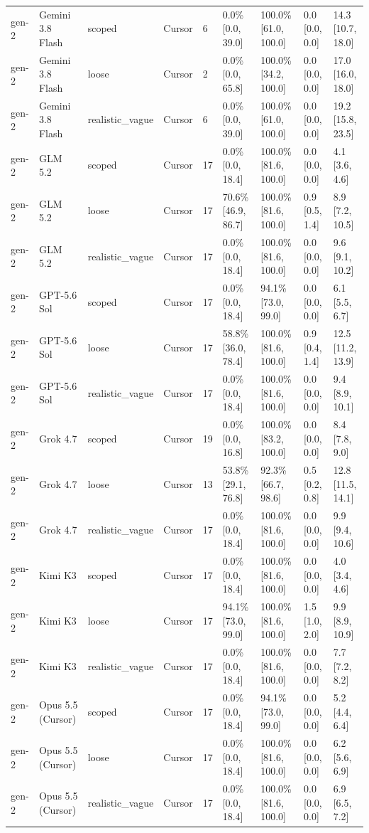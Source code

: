 \begin{tabular}{lllllllll}
gen-2 & Gemini 3.8 Flash & scoped & Cursor & 6 & 0.0\% [0.0, 39.0] & 100.0\% [61.0, 100.0] & 0.0 [0.0, 0.0] & 14.3 [10.7, 18.0] \\
gen-2 & Gemini 3.8 Flash & loose & Cursor & 2 & 0.0\% [0.0, 65.8] & 100.0\% [34.2, 100.0] & 0.0 [0.0, 0.0] & 17.0 [16.0, 18.0] \\
gen-2 & Gemini 3.8 Flash & realistic\_vague & Cursor & 6 & 0.0\% [0.0, 39.0] & 100.0\% [61.0, 100.0] & 0.0 [0.0, 0.0] & 19.2 [15.8, 23.5] \\
gen-2 & GLM 5.2 & scoped & Cursor & 17 & 0.0\% [0.0, 18.4] & 100.0\% [81.6, 100.0] & 0.0 [0.0, 0.0] & 4.1 [3.6, 4.6] \\
gen-2 & GLM 5.2 & loose & Cursor & 17 & 70.6\% [46.9, 86.7] & 100.0\% [81.6, 100.0] & 0.9 [0.5, 1.4] & 8.9 [7.2, 10.5] \\
gen-2 & GLM 5.2 & realistic\_vague & Cursor & 17 & 0.0\% [0.0, 18.4] & 100.0\% [81.6, 100.0] & 0.0 [0.0, 0.0] & 9.6 [9.1, 10.2] \\
gen-2 & GPT-5.6 Sol & scoped & Cursor & 17 & 0.0\% [0.0, 18.4] & 94.1\% [73.0, 99.0] & 0.0 [0.0, 0.0] & 6.1 [5.5, 6.7] \\
gen-2 & GPT-5.6 Sol & loose & Cursor & 17 & 58.8\% [36.0, 78.4] & 100.0\% [81.6, 100.0] & 0.9 [0.4, 1.4] & 12.5 [11.2, 13.9] \\
gen-2 & GPT-5.6 Sol & realistic\_vague & Cursor & 17 & 0.0\% [0.0, 18.4] & 100.0\% [81.6, 100.0] & 0.0 [0.0, 0.0] & 9.4 [8.9, 10.1] \\
gen-2 & Grok 4.7 & scoped & Cursor & 19 & 0.0\% [0.0, 16.8] & 100.0\% [83.2, 100.0] & 0.0 [0.0, 0.0] & 8.4 [7.8, 9.0] \\
gen-2 & Grok 4.7 & loose & Cursor & 13 & 53.8\% [29.1, 76.8] & 92.3\% [66.7, 98.6] & 0.5 [0.2, 0.8] & 12.8 [11.5, 14.1] \\
gen-2 & Grok 4.7 & realistic\_vague & Cursor & 17 & 0.0\% [0.0, 18.4] & 100.0\% [81.6, 100.0] & 0.0 [0.0, 0.0] & 9.9 [9.4, 10.6] \\
gen-2 & Kimi K3 & scoped & Cursor & 17 & 0.0\% [0.0, 18.4] & 100.0\% [81.6, 100.0] & 0.0 [0.0, 0.0] & 4.0 [3.4, 4.6] \\
gen-2 & Kimi K3 & loose & Cursor & 17 & 94.1\% [73.0, 99.0] & 100.0\% [81.6, 100.0] & 1.5 [1.0, 2.0] & 9.9 [8.9, 10.9] \\
gen-2 & Kimi K3 & realistic\_vague & Cursor & 17 & 0.0\% [0.0, 18.4] & 100.0\% [81.6, 100.0] & 0.0 [0.0, 0.0] & 7.7 [7.2, 8.2] \\
gen-2 & Opus 5.5 (Cursor) & scoped & Cursor & 17 & 0.0\% [0.0, 18.4] & 94.1\% [73.0, 99.0] & 0.0 [0.0, 0.0] & 5.2 [4.4, 6.4] \\
gen-2 & Opus 5.5 (Cursor) & loose & Cursor & 17 & 0.0\% [0.0, 18.4] & 100.0\% [81.6, 100.0] & 0.0 [0.0, 0.0] & 6.2 [5.6, 6.9] \\
gen-2 & Opus 5.5 (Cursor) & realistic\_vague & Cursor & 17 & 0.0\% [0.0, 18.4] & 100.0\% [81.6, 100.0] & 0.0 [0.0, 0.0] & 6.9 [6.5, 7.2] \\
\bottomrule
\end{tabular}
